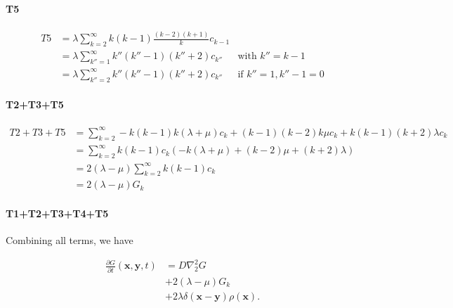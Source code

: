 \paragraph*{T5}

\begin{subequations}

\begin{align}
T5 & =\lambda\sum_{k=2}^{\infty}k(k-1)\frac{(k-2)(k+1)}{k} c_{k-1}\label{la-1}\\
 & =\lambda\sum_{k''=1}^{\infty}k''(k''-1)(k''+2) c_{k''} & \text{with }k''=k-1\\
 & =\lambda\sum_{k''=2}^{\infty}k''(k''-1)(k''+2) c_{k''} & \text{if }k''=1,k''-1=0
\end{align}

\end{subequations}

\paragraph*{T2+T3+T5}

\begin{subequations}

\begin{align}
T2+T3+T5 & =\sum_{k=2}^{\infty}-k(k-1)k(\lambda+\mu)c_{k}+(k-1)(k-2)k\mu c_{k}+k(k-1)(k+2)\lambda c_{k}\label{la-1-1}\\
 & =\sum_{k=2}^{\infty}k(k-1)c_{k}(-k(\lambda+\mu)+(k-2)\mu+(k+2)\lambda)\\
 & =2(\lambda-\mu)\sum_{k=2}^{\infty}k(k-1)c_{k}\\
 & =2(\lambda-\mu)G_{k}
\end{align}

\end{subequations}

\paragraph*{T1+T2+T3+T4+T5}

Combining all terms, we have

\begin{subequations} 
\begin{align}
\frac{\partial G}{\partial t}(\boldsymbol{x},\boldsymbol{y},t) & =D\nabla_{2}^{2}G \label{nk_diffusion-1}\\
 & +2(\lambda-\mu)G_{k} \label{nk_same_state-1}\\
 & +2\lambda\delta(\boldsymbol{x}-\boldsymbol{y})\rho(\boldsymbol{x}). \label{nk_death-1}
\end{align}
\end{subequations}

